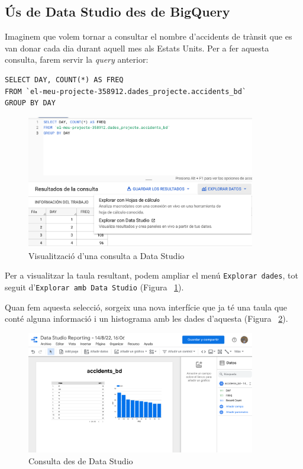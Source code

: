 \documentclass[11pt,longbibliography]{article}
\theoremstyle{definition}
\theoremstyle{remark}
\begin{document}
\subsection{Ús de Data Studio des de BigQuery}

Imaginem que volem tornar a consultar el nombre d'accidents de trànsit que es van donar cada dia durant aquell mes als Estats Units. Per a fer aquesta consulta, farem servir la \textit{query} anterior:

\begin{verbatim}
SELECT DAY, COUNT(*) AS FREQ
FROM `el-meu-projecte-358912.dades_projecte.accidents_bd`
GROUP BY DAY
\end{verbatim}


\begin{figure}[h!]
\begin{center}
\includegraphics[width=10cm]{bq26}
\end{center}
\caption{Visualització d'una consulta a Data Studio}
\label{fig:bq26}
\end{figure}


Per a visualitzar la taula resultant, podem ampliar el menú \verb|Explorar dades|, tot seguit d'\verb|Explorar amb Data Studio| (Figura ~\ref{fig:bq26}).


Quan fem aquesta selecció, sorgeix una nova interfície que ja té una taula que conté alguna informació i un histograma amb les dades d'aquesta (Figura ~\ref{fig:bq27}).

\begin{figure}[h!]
\begin{center}
\includegraphics[width=10cm]{bq27}
\end{center}
\caption{Consulta des de Data Studio}
\label{fig:bq27}
\end{figure}
\end{document}
